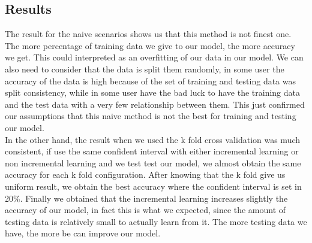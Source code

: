 \subsection{Results}\label{subsec:results}

The result for the naive scenarios shows us that this method is not finest one. The more percentage of training data we give to our model, the more accuracy we get. This could interpreted as an overfitting of our data in our model. We can also need to consider that the data is split them randomly, in some user the accuracy of the data is high because of the set of training and testing data was split consistency, while in some user have the bad luck to have the training data and the test data with a very few relationship between them. This just confirmed our assumptions that this naive method is not the best for training and testing our model.
\\[2ex]
In the other hand, the result when we used the k fold cross validation was much consistent, if use the same confident interval with either incremental learning or non incremental learning and we test test our model, we almost obtain the same accuracy for each k fold configuration. After knowing that the k fold give us uniform result, we obtain the best accuracy where the confident interval is set in 20\%. Finally we obtained that the incremental learning increases slightly the accuracy of our model, in fact this is what we expected, since the amount of testing data is relatively small to actually learn from it. The more testing data we have, the more be can improve our model.
